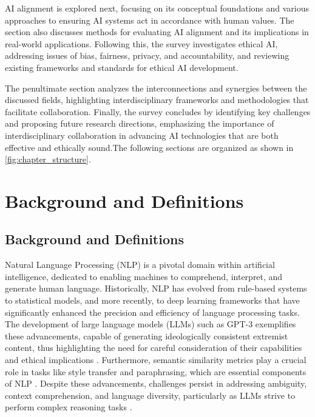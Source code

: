 AI alignment is explored next, focusing on its conceptual foundations and various approaches to ensuring AI systems act in accordance with human values. The section also discusses methods for evaluating AI alignment and its implications in real-world applications. Following this, the survey investigates ethical AI, addressing issues of bias, fairness, privacy, and accountability, and reviewing existing frameworks and standards for ethical AI development.



The penultimate section analyzes the interconnections and synergies between the discussed fields, highlighting interdisciplinary frameworks and methodologies that facilitate collaboration. Finally, the survey concludes by identifying key challenges and proposing future research directions, emphasizing the importance of interdisciplinary collaboration in advancing AI technologies that are both effective and ethically sound.The following sections are organized as shown in \autoref{fig:chapter_structure}.









\section{Background and Definitions} \label{sec:Background and Definitions}



\subsection{Background and Definitions} \label{subsec:Background and Definitions}

Natural Language Processing (NLP) is a pivotal domain within artificial intelligence, dedicated to enabling machines to comprehend, interpret, and generate human language. Historically, NLP has evolved from rule-based systems to statistical models, and more recently, to deep learning frameworks that have significantly enhanced the precision and efficiency of language processing tasks. The development of large language models (LLMs) such as GPT-3 exemplifies these advancements, capable of generating ideologically consistent extremist content, thus highlighting the need for careful consideration of their capabilities and ethical implications \cite{mcguffie2020radicalizationrisksgpt3advanced}. Furthermore, semantic similarity metrics play a crucial role in tasks like style transfer and paraphrasing, which are essential components of NLP \cite{yamshchikov2020styletransferparaphraselookingsensible}. Despite these advancements, challenges persist in addressing ambiguity, context comprehension, and language diversity, particularly as LLMs strive to perform complex reasoning tasks \cite{lathouwers2017memorypaysdiscordhidden}.



